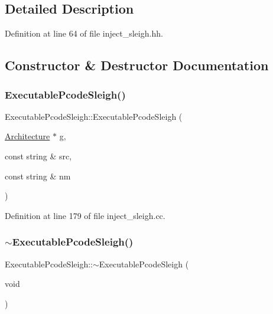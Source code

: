 \subsection{Detailed Description}


Definition at line 64 of file inject\+\_\+sleigh.\+hh.



\subsection{Constructor \& Destructor Documentation}
\mbox{\label{class_executable_pcode_sleigh_a6ff724654bd9402977ba1999cfe4f8a3}} 
\subsubsection{\texorpdfstring{ExecutablePcodeSleigh()}{ExecutablePcodeSleigh()}}
{\footnotesize\ttfamily Executable\+Pcode\+Sleigh\+::\+Executable\+Pcode\+Sleigh (\begin{DoxyParamCaption}\item[{\mbox{\hyperlink{class_architecture}{Architecture}} $\ast$}]{g,  }\item[{const string \&}]{src,  }\item[{const string \&}]{nm }\end{DoxyParamCaption})}



Definition at line 179 of file inject\+\_\+sleigh.\+cc.

\mbox{\label{class_executable_pcode_sleigh_a2c9bd0277ad3c6d111cd762e442f9074}} 
\subsubsection{\texorpdfstring{$\sim$ExecutablePcodeSleigh()}{~ExecutablePcodeSleigh()}}
{\footnotesize\ttfamily Executable\+Pcode\+Sleigh\+::$\sim$\+Executable\+Pcode\+Sleigh (\begin{DoxyParamCaption}\item[{void}]{ }\end{DoxyParamCaption})\hspace{0.3cm}{\ttfamily [virtual]}}




